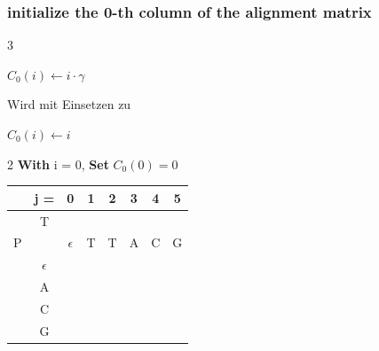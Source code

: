 \subsubsection*{initialize the 0-th column of the alignment matrix}
\begin{multicols}{3}
    \begin{algorithmic}
            \State $C_0 (i) \gets i \cdot \gamma$
        \EndFor
    \end{algorithmic}
    \columnbreak
    Wird mit Einsetzen zu
    \columnbreak
    \begin{algorithmic}
            \State $C_0 (i) \gets i $
        \EndFor
    \end{algorithmic}
\end{multicols}

\newpage

\begin{multicols}{2}
    \textbf{With} i = 0, \textbf{Set} $C_0(0) = 0$

    \begin{center}
        \begin{tabular}{|c c|c|c|c|c|c|c|} \hline
        &   j =  &  0           &   1   &   2   &   3   &   4   &   5   \\ \hline
        &   T    &              &       &       &       &       &       \\
        P   &        &  $\epsilon$  &   T   &   T   &   A   &   C   &   G   \\ \hline
        & $\epsilon$ &   \ccr0      &       &       &       &       &       \\ \hline
        &    A   &              &       &       &       &       &       \\ \hline
        &    C   &              &       &       &       &       &       \\ \hline
        &    G   &              &       &       &       &       &       \\ \hline
        \end{tabular}
    \end{center}
\end{multicols}

